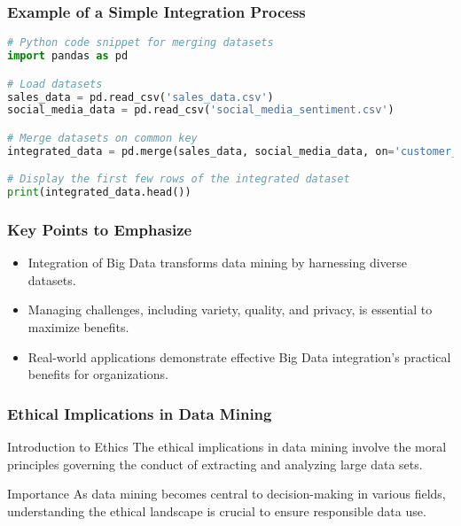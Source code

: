 \documentclass{beamer}
\begin{document}
\begin{frame}[fragile]
    \frametitle{Example of a Simple Integration Process}

    \begin{lstlisting}[language=Python]
# Python code snippet for merging datasets
import pandas as pd

# Load datasets
sales_data = pd.read_csv('sales_data.csv')
social_media_data = pd.read_csv('social_media_sentiment.csv')

# Merge datasets on common key
integrated_data = pd.merge(sales_data, social_media_data, on='customer_id', how='inner')

# Display the first few rows of the integrated dataset
print(integrated_data.head())
    \end{lstlisting}
\end{frame}

\begin{frame}
    \frametitle{Key Points to Emphasize}

    \begin{itemize}
        \item Integration of Big Data transforms data mining by harnessing diverse datasets.
        \item Managing challenges, including variety, quality, and privacy, is essential to maximize benefits.
        \item Real-world applications demonstrate effective Big Data integration's practical benefits for organizations.
    \end{itemize}
\end{frame}

\begin{frame}[fragile]
    \frametitle{Ethical Implications in Data Mining}
    
    \begin{block}{Introduction to Ethics}
        The ethical implications in data mining involve the moral principles governing the conduct of extracting and analyzing large data sets. 
    \end{block}
    
    \begin{block}{Importance}
        As data mining becomes central to decision-making in various fields, understanding the ethical landscape is crucial to ensure responsible data use.
    \end{block}
\end{frame}
\end{document}
